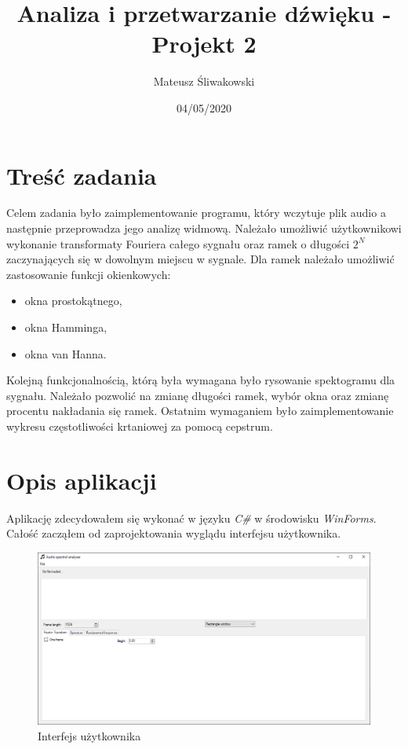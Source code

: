 \documentclass{article}
\title{Analiza i przetwarzanie dźwięku - Projekt 2}
\date{04/05/2020}
\author{Mateusz Śliwakowski}
\begin{document}
  \maketitle
  
\section{Treść zadania}
Celem zadania było zaimplementowanie programu, który wczytuje plik audio a następnie przeprowadza jego analizę widmową. Należało umożliwić użytkownikowi wykonanie transformaty Fouriera całego sygnału oraz ramek o długości $2^N$ zaczynających się w dowolnym miejscu w sygnale. Dla ramek należało umożliwić zastosowanie funkcji okienkowych:
\begin{itemize}
\item okna prostokątnego,
\item okna Hamminga,
\item okna van Hanna.
\end{itemize}
Kolejną funkcjonalnością, którą była wymagana było rysowanie spektogramu dla sygnału. Należało pozwolić na zmianę długości ramek, wybór okna oraz zmianę procentu nakładania się ramek. Ostatnim wymaganiem było zaimplementowanie wykresu częstotliwości krtaniowej za pomocą cepstrum.

\section{Opis aplikacji}

Aplikację zdecydowałem się wykonać w języku \textit{C\#} w środowisku \textit{WinForms}. Całość zacząłem od zaprojektowania wyglądu interfejsu użytkownika.

\begin{figure}[h]
\includegraphics[width=\textwidth]{scr1.png}
\caption{Interfejs użytkownika}
\label{fig:interface}
\end{figure}
\end{document}
